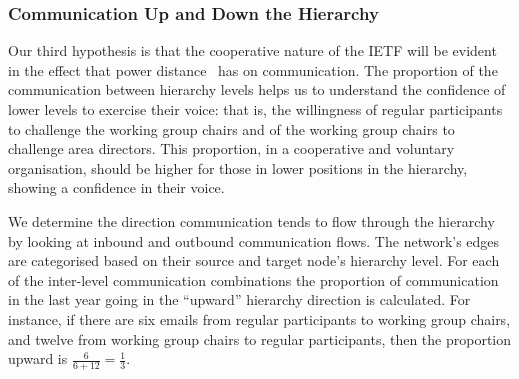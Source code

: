 \documentclass[twocolumn,10pt]{article}
\begin{document}
\subsubsection{Communication Up and Down the Hierarchy}
\label{sec:org-dyn:hierarchy:rq3}



Our third hypothesis is that the cooperative nature of the IETF will be
evident in the effect that power distance~\cite{li2021does} has on
communication. The proportion of the communication between hierarchy levels
helps us to understand the confidence of lower levels to exercise their
voice: that is, the willingness of regular participants to challenge the
working group chairs and of the working group chairs to challenge area
directors.  This proportion, in a cooperative and voluntary organisation,
should be higher for those in lower positions in the hierarchy, showing a
confidence in their voice.



We determine the direction communication tends to flow through the
hierarchy by looking at inbound and outbound communication flows. The
network's edges are categorised based on their source and target node's
hierarchy level. For each of the inter-level communication combinations the
proportion of communication in the last year going in the ``upward''
hierarchy direction is calculated. For instance, if there are six emails
from regular participants to working group chairs, and twelve from working
group chairs to regular participants, then the proportion upward is
$\frac{6}{6+12}=\frac{1}{3}$. 
\end{document}
